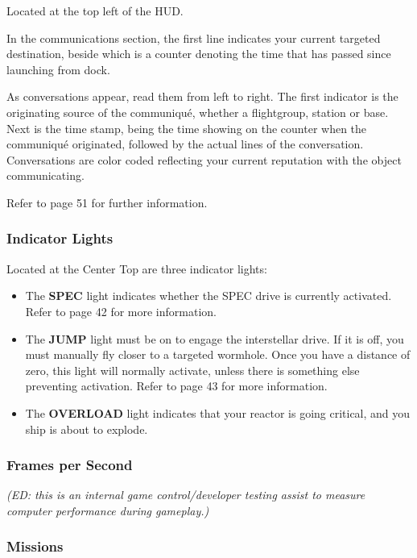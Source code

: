 \documentclass{article}
\begin{document}
Located at the top left of the HUD. 

In the communications section, the first line indicates your current targeted destination, beside which is a counter denoting the time that has passed since launching from dock. 

As conversations appear, read them from left to right. The first indicator is the originating source of the communiqué, whether a flightgroup, station or base. Next is the time stamp, being the time showing on the counter when the communiqué originated, followed by the actual lines of the conversation. Conversations are color coded reflecting your current reputation with the object communicating. 

Refer to page 51 for further information. 

\subsubsection{Indicator Lights }

Located at the Center Top are three indicator lights: 

\begin{itemize}
\item  The \textbf{SPEC} light indicates whether the SPEC drive is currently activated. Refer to page 42 for more information. 

\item  The \textbf{JUMP} light must be on to engage the interstellar drive. If it is off, you must manually fly closer to a targeted wormhole. Once you have a distance of zero, this light will normally activate, unless there is something else preventing activation. Refer to page 43 for more information. 

\item  The \textbf{OVERLOAD} light indicates that your reactor is going critical, and you ship is about to explode. 
\end{itemize}


\subsubsection{Frames per Second }

\textit{(ED: this is an internal game control/developer testing assist to measure computer performance during gameplay.) }

\subsubsection{Missions }
\end{document}
